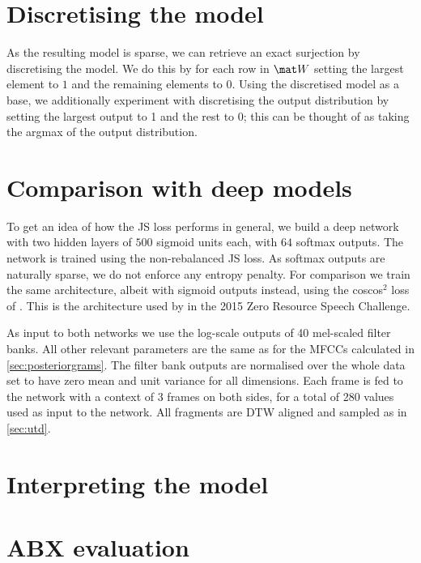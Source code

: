 \section{Discretising the model}
As the resulting model is sparse, we can retrieve an exact surjection by discretising the model.
We do this by for each row in $\mat W$ setting the largest element to $1$ and the remaining elements to $0$.
Using the discretised model as a base, we additionally experiment with discretising the output distribution by setting the largest output to 1 and the rest to 0; this can be thought of as taking the argmax of the output distribution.

\section{Comparison with deep models}
To get an idea of how the JS loss performs in general, we build a deep network with two hidden layers of $500$ sigmoid units each, with $64$ softmax outputs.
The network is trained using the non-rebalanced JS loss.
As softmax outputs are naturally sparse, we do not enforce any entropy penalty.
For comparison we train the same architecture, albeit with sigmoid outputs instead, using the coscos$^2$ loss of \textcite{synnaeve2014phonetics}.
This is the architecture used by \textcite{thiolliere2015hybrid} in the 2015 Zero Resource Speech Challenge.

As input to both networks we use the log-scale outputs of 40 mel-scaled filter banks.
All other relevant parameters are the same as for the MFCCs calculated in \cref{sec:posteriorgrams}.
The filter bank outputs are normalised over the whole data set to have zero mean and unit variance for all dimensions.
Each frame is fed to the network with a context of 3 frames on both sides, for a total of 280 values used as input to the network.
All fragments are DTW aligned and sampled as in \cref{sec:utd}.

\section{Interpreting the model}

\section{ABX evaluation}
